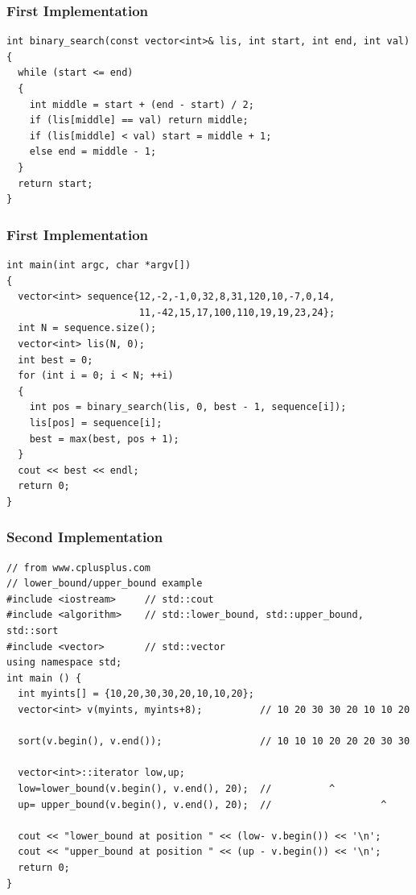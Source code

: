 \documentclass{beamer}
\begin{document}
\begin{frame}[containsverbatim]
\frametitle{First Implementation}

\scriptsize
\begin{lstlisting}
int binary_search(const vector<int>& lis, int start, int end, int val)
{
  while (start <= end)
  {
    int middle = start + (end - start) / 2;
    if (lis[middle] == val) return middle;
    if (lis[middle] < val) start = middle + 1;
    else end = middle - 1;
  }
  return start;
}
\end{lstlisting}

\end{frame}

\begin{frame}[containsverbatim]
\frametitle{First Implementation}

\scriptsize
\begin{lstlisting}
int main(int argc, char *argv[])
{
  vector<int> sequence{12,-2,-1,0,32,8,31,120,10,-7,0,14,
                       11,-42,15,17,100,110,19,19,23,24};
  int N = sequence.size();
  vector<int> lis(N, 0);
  int best = 0;
  for (int i = 0; i < N; ++i)
  {
    int pos = binary_search(lis, 0, best - 1, sequence[i]);
    lis[pos] = sequence[i];
    best = max(best, pos + 1);
  }
  cout << best << endl;
  return 0;
}
\end{lstlisting}

\end{frame}

\begin{frame}[containsverbatim]
\frametitle{Second Implementation}

\scriptsize
\begin{lstlisting}
// from www.cplusplus.com
// lower_bound/upper_bound example
#include <iostream>     // std::cout
#include <algorithm>    // std::lower_bound, std::upper_bound, std::sort
#include <vector>       // std::vector
using namespace std;
int main () {
  int myints[] = {10,20,30,30,20,10,10,20};
  vector<int> v(myints, myints+8);          // 10 20 30 30 20 10 10 20

  sort(v.begin(), v.end());                 // 10 10 10 20 20 20 30 30

  vector<int>::iterator low,up;
  low=lower_bound(v.begin(), v.end(), 20);  //          ^
  up= upper_bound(v.begin(), v.end(), 20);  //                   ^

  cout << "lower_bound at position " << (low- v.begin()) << '\n';
  cout << "upper_bound at position " << (up - v.begin()) << '\n';
  return 0;
}
\end{lstlisting}

\end{frame}
\end{document}

